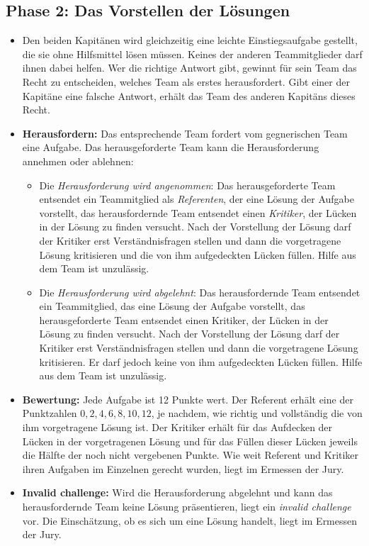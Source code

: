 \subsection*{Phase 2: Das Vorstellen der Lösungen}
\begin{itemize}
	\item Den beiden Kapitänen wird gleichzeitig eine leichte Einstiegsaufgabe gestellt, die sie ohne Hilfsmittel lösen müssen. Keines der anderen Teammitglieder darf ihnen dabei helfen. Wer die richtige Antwort gibt, gewinnt für sein Team das Recht zu entscheiden, welches Team als erstes herausfordert. Gibt einer der Kapitäne eine falsche Antwort, erhält das Team des anderen Kapitäns dieses Recht.  
	\item \textbf{Herausfordern:} Das entsprechende Team fordert vom gegnerischen Team eine Aufgabe. Das herausgeforderte Team kann die Herausforderung annehmen oder ablehnen:
	\begin{itemize}
		\item Die \textit{Herausforderung wird angenommen}: Das herausgeforderte Team entsendet ein Teammitglied als \textit{Referenten}, der eine Lösung der Aufgabe vorstellt, das herausfordernde Team entsendet einen \textit{Kritiker}, der Lücken in der Lösung zu finden versucht. Nach der Vorstellung der Lösung darf der Kritiker erst Verständnisfragen stellen und dann die vorgetragene Lösung kritisieren und die von ihm aufgedeckten Lücken füllen. Hilfe aus dem Team ist unzulässig.
		\item Die \textit{Herausforderung wird abgelehnt}: Das herausfordernde Team entsendet ein Teammitglied, das eine Lösung der Aufgabe vorstellt, das herausgeforderte  Team entsendet einen Kritiker, der Lücken in der Lösung zu finden versucht. Nach der Vorstellung der Lösung darf der Kritiker erst Verständnisfragen stellen und dann die vorgetragene Lösung kritisieren. Er darf jedoch keine von ihm aufgedeckten Lücken füllen. Hilfe aus dem Team ist unzulässig.
	\end{itemize}
	\item \textbf{Bewertung:} Jede Aufgabe ist 12 Punkte wert. Der Referent erhält eine der Punktzahlen $0, 2, 4, 6, 8, 10, 12$, je nachdem, wie richtig und vollständig die von ihm vorgetragene Lösung ist. Der Kritiker erhält für das Aufdecken der Lücken in der vorgetragenen Lösung und für das Füllen dieser Lücken jeweils die Hälfte der noch nicht vergebenen Punkte. Wie weit Referent und Kritiker ihren Aufgaben im Einzelnen gerecht wurden, liegt im Ermessen der Jury.
	\item \textbf{Invalid challenge:} Wird die Herausforderung abgelehnt und kann das herausfordernde Team keine Lösung präsentieren, liegt ein \emph{invalid challenge} vor. Die Einschätzung, ob es sich um eine Lösung handelt, liegt im Ermessen der Jury.
	

\end{itemize}
